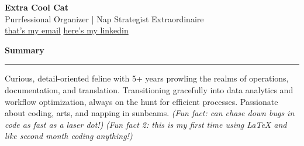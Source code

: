 \documentclass[11pt,a4paper]{article} %
\newcommand{\sectiontitle}[1]{%
  \vspace{1.2ex}%
  {\Large\bfseries\color{duskPurple} #1}%
  \vspace{0.6ex}\hrule\vspace{0.8ex}%
}
\begin{document}
\begin{center}
    {\huge \bfseries Extra Cool Cat} \\[0.6ex]
    \textcolor{duskPurple}{Purrfessional Organizer | Nap Strategist Extraordinaire} \\[0.8ex]
    \href{mailto:extracoolcat@gmail.com}{that's my email} \quad
    \href{https://linkedin.com/in/extracoolcat}{here's my linkedin}
\end{center}

\vspace{-1ex}
\sectiontitle{Summary}
Curious, detail-oriented feline with 5+ years prowling the realms of operations, documentation, and translation. Transitioning gracefully into data analytics and workflow optimization, always on the hunt for efficient processes. Passionate about coding, arts, and napping in sunbeams.  
\textit{(Fun fact: can chase down bugs in code as fast as a laser dot!)}
\textit{(Fun fact 2: this is my first time using LaTeX and like second month coding anything!)}

\vspace{1ex} %
\end{document}
